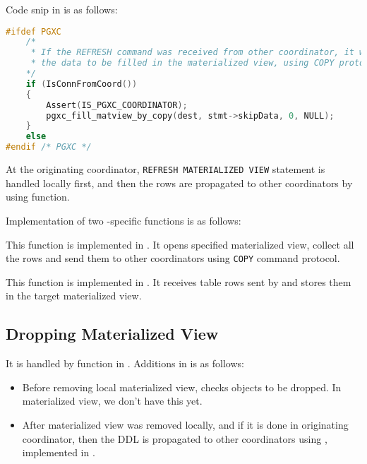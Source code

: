   Code snip in  is as follows:

\begin{lstlisting}[frame=single, tabsize=4, language=C]
#ifdef PGXC
    /*
	 * If the REFRESH command was received from other coordinator, it will also send
	 * the data to be filled in the materialized view, using COPY protocol.
	*/
    if (IsConnFromCoord())
	{
		Assert(IS_PGXC_COORDINATOR);
		pgxc_fill_matview_by_copy(dest, stmt->skipData, 0, NULL);
	}
    else
#endif /* PGXC */
\end{lstlisting}

  At the originating coordinator, \texttt{REFRESH MATERIALIZED VIEW} statement is handled locally
  first, and then the rows are propagated to other coordinators by using
   function.
  
  Implementation of two \XC-specific functions is as follows:



  This function is implemented in .
  It  opens specified materialized view, collect all the rows and send them to other
  coordinators using \texttt{COPY} command protocol.




  This function is implemented in .
  It receives table rows sent by  and stores them in
  the target materialized view.



\subsection{Dropping Materialized View}

  It is handled by  function in .
  Additions in \XC{} is as follows:
  
  \begin{itemize}
	  \item Before removing local materialized view, \XC{} checks objects to be dropped.
	  		In materialized view, we don't have this yet.
	  \item After materialized view was removed locally, and if it is done in originating
	  		coordinator, then the DDL is propagated to other coordinators using
			, implemented in .
  \end{itemize}
  
